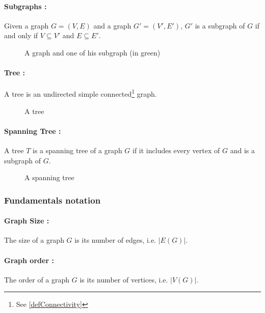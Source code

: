 \paragraph{Subgraphs :}
Given a graph $G = (V,E)$ and a graph $G' = (V',E')$, $G'$ is a subgraph of $G$ 
if and only if $V \subseteq V'$ and $E \subseteq E'$.

\begin{figure}[!h]
  \begin{center}
    
  \end{center}
  \caption{A graph and one of his subgraph (in green)}
\end{figure}

\paragraph{Tree :}
A tree is an undirected simple connected\footnote{See \ref{defConnectivity}}
graph.

\begin{figure}[!h]
  \begin{center}
    
  \end{center}
  \caption{A tree}
\end{figure}

\paragraph{Spanning Tree :}
A tree $T$ is a spanning tree of a graph $G$ if it includes every vertex of $G$ 
and is a subgraph of $G$.

\begin{figure}[!h]
  \begin{center}
    
  \end{center}
  \caption{A spanning tree}
\end{figure}

\subsubsection{Fundamentals notation}
\paragraph{Graph Size :}
The size of a graph $G$ is its number of edges, i.e. $|E(G)|$.

\paragraph{Graph order :}
The order of a graph $G$ is its number of vertices, i.e. $|V(G)|$.

